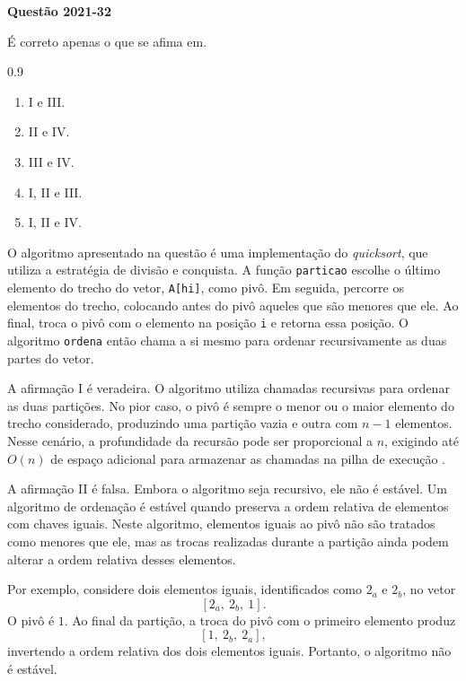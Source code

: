 \documentclass[12pt,a4paper]{article}
\newenvironment{question}[1]{%
    \pdfbookmark[3]{Questão #1}{q:#1}
    \label{q:#1}
    \bigskip\par\noindent
    \textbf{Questão #1} \dotfill
    \medskip\par\nopagebreak\noindent
    \ignorespaces
}{%
    \noindent\dotfill\medskip
}
\begin{document}
\begin{question}{2021-32}
\noindent
É correto apenas o que se afima em.

\begin{spacing}{0.9}
\begin{small}
\begin{enumerate}[label=\Alph*)]
    \item I e III.
    \item II e IV.
    \item III e IV.
    \item I, II e III.
    \item I, II e IV.
\end{enumerate}
\end{small}
\end{spacing}
\end{question}

O algoritmo apresentado na questão é uma implementação do \textit{quicksort}, que utiliza a estratégia de divisão e conquista.
A função \texttt{particao} escolhe o último elemento do trecho do vetor, \texttt{A[hi]}, como pivô.
Em seguida, percorre os elementos do trecho, colocando antes do pivô aqueles que são menores que ele.
Ao final, troca o pivô com o elemento na posição \texttt{i} e retorna essa posição.
O algoritmo \texttt{ordena} então chama a si mesmo para ordenar recursivamente as duas partes do vetor.

A afirmação I é veradeira.
O algoritmo utiliza chamadas recursivas para ordenar as duas partições. No pior caso,
o pivô é sempre o menor ou o maior elemento do trecho considerado, produzindo uma partição vazia e outra com $n-1$ elementos.
Nesse cenário, a profundidade da recursão pode ser proporcional a $n$, exigindo até $O(n)$ de espaço adicional para armazenar
as chamadas na pilha de execução \parencite[seç.~7.2 e 7.4.1]{clrs2022}.

A afirmação II é falsa.
Embora o algoritmo seja recursivo, ele não é estável.
Um algoritmo de ordenação é estável quando preserva a ordem relativa de elementos com chaves iguais.
Neste algoritmo, elementos iguais ao pivô não são tratados como menores que ele,
mas as trocas realizadas durante a partição ainda podem alterar a ordem relativa desses elementos.

Por exemplo, considere dois elementos iguais, identificados como $2_a$ e $2_b$, no vetor
\[
    [2_a,\ 2_b,\ 1].
\]
O pivô é $1$. Ao final da partição, a troca do pivô com o primeiro elemento produz
\[
    [1,\ 2_b,\ 2_a],
\]
invertendo a ordem relativa dos dois elementos iguais. Portanto, o algoritmo não é estável.
\end{document}
